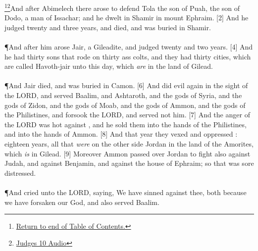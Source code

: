 \footnote{\textcolor[rgb]{0.00,0.25,0.00}{\hyperlink{JudgesTOC}{Return to end of Table of Contents.}}}\footnote{\href{https://audiobible.com/bible/judges_10.html}{\textcolor[cmyk]{0.99998,1,0,0}{Judges 10 Audio}}}\textcolor[cmyk]{0.99998,1,0,0}{And after Abimelech there arose to defend  Tola the son of Puah, the son of Dodo, a man of Issachar; and he dwelt in Shamir in mount Ephraim.}
[2] \textcolor[cmyk]{0.99998,1,0,0}{And he judged  twenty and three years, and died, and was buried in Shamir.}\\
\\
\P \textcolor[cmyk]{0.99998,1,0,0}{And after him arose Jair, a Gileadite, and judged  twenty and two years.}
[4] \textcolor[cmyk]{0.99998,1,0,0}{And he had thirty sons that rode on thirty ass colts, and they had thirty cities, which are called Havoth-jair unto this day, which \emph{are} in the land of Gilead.}\\
\\
\P \textcolor[cmyk]{0.99998,1,0,0}{And Jair died, and was buried in Camon.}
[6] \textcolor[cmyk]{0.99998,1,0,0}{And   did evil again in the sight of the LORD, and served Baalim, and Ashtaroth, and the gods of Syria, and the gods of Zidon, and the gods of Moab, and the gods of  Ammon, and the gods of the Philistines, and forsook the LORD, and served not him.}
[7] \textcolor[cmyk]{0.99998,1,0,0}{And the anger of the LORD was hot against , and he sold them into the hands of the Philistines, and into the hands of  Ammon.}
[8] \textcolor[cmyk]{0.99998,1,0,0}{And that year they vexed and oppressed  : eighteen years, all   that \emph{were} on the other side Jordan in the land of the Amorites, which \emph{is} in Gilead.}
[9] \textcolor[cmyk]{0.99998,1,0,0}{Moreover  Ammon passed over Jordan to fight also against Judah, and against Benjamin, and against the house of Ephraim; so that  was sore distressed.}\\
\\
\P \textcolor[cmyk]{0.99998,1,0,0}{And   cried unto the LORD, saying, We have sinned against thee, both because we have forsaken our God, and also served Baalim.}
